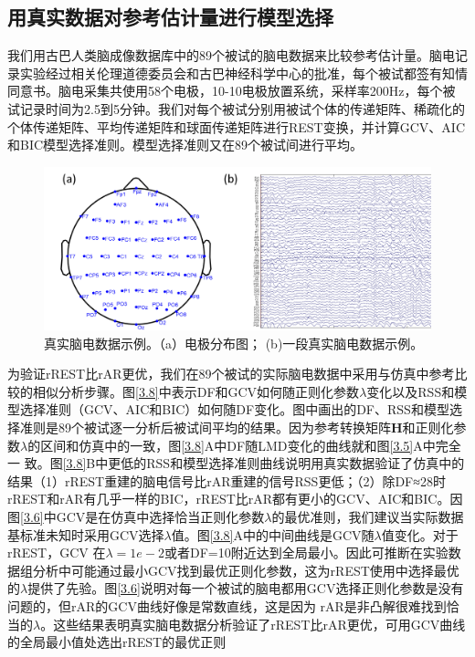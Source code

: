 \subsection{用真实数据对参考估计量进行模型选择}
我们用古巴人类脑成像数据库中的89个被试的脑电数据来比较参考估计量。脑电记录实验经过相关伦理道德委员会和古巴神经科学中心的批准，每个被试都签有知情同意书。脑电采集共使用58个电极，10-10电极放置系统，采样率200Hz，每个被试记录时间为2.5到5分钟。我们对每个被试分别用被试个体的传递矩阵、稀疏化的个体传递矩阵、平均传递矩阵和球面传递矩阵进行REST变换，并计算GCV、AIC和BIC模型选择准则。模型选择准则又在89个被试间进行平均。 
\begin{figure}[!h]
	\centering
	\includegraphics[width=15cm]{pic/Frontier/figure7.png}
	\caption{真实脑电数据示例。（a）电极分布图； (b)一段真实脑电数据示例。}
	\label{3.7}
\end{figure}
为验证rREST比rAR更优，我们在89个被试的实际脑电数据中采用与仿真中参考比较的相似分析步骤。图\ref{3.8}中表示DF和GCV如何随正则化参数$\lambda$变化以及RSS和模型选择准则（GCV、AIC和BIC）如何随DF变化。图中画出的DF、RSS和模型选择准则是89个被试逐一分析后被试间平均的结果。因为参考转换矩阵$\mathbf{H}$和正则化参数$\lambda$的区间和仿真中的一致，图\ref{3.8}A中DF随LMD变化的曲线就和图\ref{3.5}A中完全一
致。图\ref{3.8}B中更低的RSS和模型选择准则曲线说明用真实数据验证了仿真中的结果（1）rREST重建的脑电信号比rAR重建的信号RSS更低；（2）除DF≈28时rREST和rAR有几乎一样的BIC，rREST比rAR都有更小的GCV、AIC和BIC。因图\ref{3.6}中GCV是在仿真中选择恰当正则化参数$\lambda$的最优准则，我们建议当实际数据基标准未知时采用GCV选择$\lambda$值。图\ref{3.8}A中的中间曲线是GCV随$\lambda$值变化。对于rREST，GCV
在$\lambda=1e-2$或者DF=10附近达到全局最小。因此可推断在实验数据组分析中可能通过最小GCV找到最优正则化参数，这为rREST使用中选择最优
的$\lambda$提供了先验。图\ref{3.6}说明对每一个被试的脑电都用GCV选择正则化参数是没有问题的，但rAR的GCV曲线好像是常数直线，这是因为
rAR是非凸解很难找到恰当的$\lambda$。这些结果表明真实脑电数据分析验证了rREST比rAR更优，可用GCV曲线的全局最小值处选出rREST的最优正则
